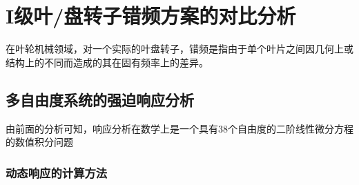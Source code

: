 \documentclass[UTF8, a4paper, openany, twoside]{ctexart}
\begin{document}
\makecover

\tableofcontents
\clearpage

\section{I级叶/盘转子错频方案的对比分析}

在叶轮机械领域，对一个实际的叶盘转子，错频是指由于单个叶片之间因几何上或结构上的不同而造成的其在固有频率上的差异。

\subsection{多自由度系统的强迫响应分析}

由前面的分析可知，响应分析在数学上是一个具有38个自由度的二阶线性微分方程的数值积分问题

\subsubsection{动态响应的计算方法}
\end{document}
